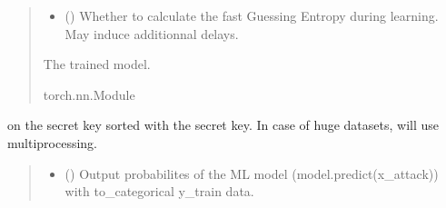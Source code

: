\documentclass[letterpaper,10pt,english]{sphinxmanual}
\begin{document}
\begin{fulllineitems}
\begin{fulllineitems}
\begin{quote}
\begin{description}
\begin{itemize}
\item {} 
\sphinxAtStartPar
{} (\sphinxstyleliteralemphasis{\sphinxupquote{, }}) \textendash{} Whether to calculate the fast Guessing Entropy during learning. May induce
additionnal delays.

\end{itemize}

\sphinxAtStartPar
{} \textendash{} The trained model.

\sphinxAtStartPar
torch.nn.Module

\end{description}\end{quote}

\end{fulllineitems}


\begin{fulllineitems}
\label{\detokenize{MLSCAlib.Attacks:MLSCAlib.Attacks.attack.Attack.turn_output_probas_to_key_proba}}
\pysigstartsignatures
{}
\pysigstopsignatures\begin{description}
\sphinxAtStartPar
on the secret key sorted with the secret key. In case of huge datasets, will use multiprocessing.

\end{description}
\begin{quote}\begin{description}
\begin{itemize}
\item {} 
\sphinxAtStartPar
{} (\sphinxstyleliteralemphasis{\sphinxupquote{{[}}}\sphinxstyleliteralemphasis{\sphinxupquote{{]}}}) \textendash{} Output probabilites of the ML model (model.predict(x\_attack)) with to\_categorical y\_train data.


\end{itemize}
\end{description}
\end{quote}
\end{fulllineitems}
\end{fulllineitems}
\end{document}
